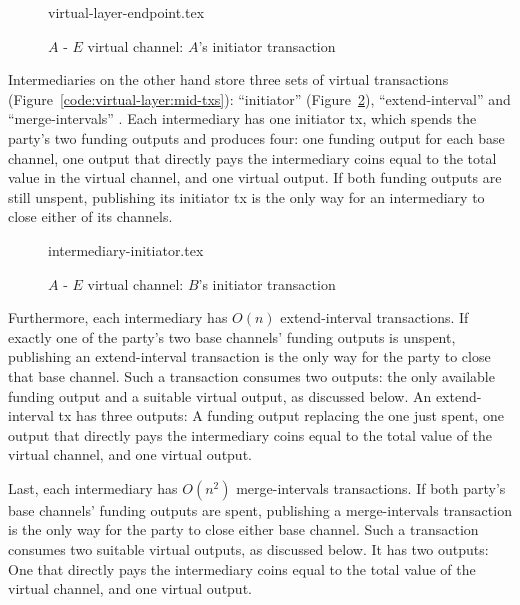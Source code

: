   \begin{figure}
    {virtual-layer-endpoint.tex}
    \caption{$A$ - $E$ virtual channel: $A$'s initiator transaction}
    \label{figure:virtual-layer-endpoint}
  \end{figure}

  Intermediaries on the other hand store three sets of virtual transactions
  (Figure~\ref{code:virtual-layer:mid-txs}): ``initiator''
  (Figure~\ref{figure:virtual-layer-initiator}), ``extend-interval''
   and ``merge-intervals''
  . Each intermediary has one
  initiator tx, which spends the party's two funding outputs and produces four:
  one funding output for each base channel, one output that directly pays the
  intermediary coins equal to the total value in the virtual channel, and one
  virtual output. If both funding outputs are still unspent, publishing its
  initiator tx is the only way for an intermediary to close either of its
  channels.

  \begin{figure}
    {intermediary-initiator.tex}
    \caption{$A$ - $E$ virtual channel: $B$'s initiator transaction}
    \label{figure:virtual-layer-initiator}
  \end{figure}


  Furthermore, each intermediary has $O(n)$ extend-interval transactions. If
  exactly one of the party's two base channels' funding outputs is unspent,
  publishing an extend-interval transaction is the only way for the party to
  close that base channel. Such a transaction consumes two outputs: the only
  available funding output and a suitable virtual output, as discussed below. An
  extend-interval tx has three outputs: A funding output replacing the one just
  spent, one output that directly pays the intermediary coins equal to the total
  value of the virtual channel, and one virtual output.

  Last, each intermediary has $O(n^2)$ merge-intervals transactions. If both
  party's base channels' funding outputs are spent, publishing a merge-intervals
  transaction is the only way for the party to close either base channel. Such a
  transaction consumes two suitable virtual outputs, as discussed below. It has
  two outputs: One that directly pays the intermediary coins equal to the total
  value of the virtual channel, and one virtual output.

